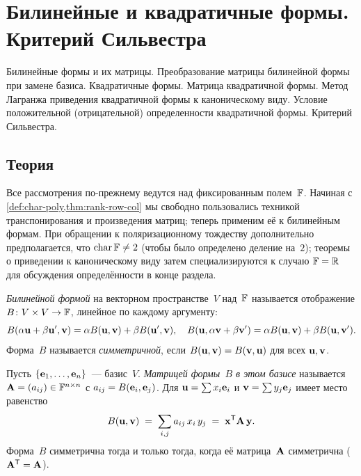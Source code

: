 
\section{Билинейные и квадратичные формы. Критерий Сильвестра}
\label{sec:1.1.07-quadratic-forms}

\begin{ticket}
Билинейные формы и их матрицы. Преобразование матрицы билинейной формы при замене базиса. Квадратичные формы. Матрица квадратичной формы. Метод Лагранжа приведения квадратичной формы к каноническому виду. Условие положительной (отрицательной) определенности квадратичной формы. Критерий Сильвестра.
\end{ticket}

\subsection*{Теория}

Все рассмотрения по-прежнему ведутся над фиксированным полем~$\mathbb{F}$.
Начиная с \cref{def:char-poly,thm:rank-row-col} мы свободно
пользовались техникой транспонирования и произведения матриц; теперь
применим её к билинейным формам. При обращении к поляризационному
тождеству дополнительно предполагается, что
$\operatorname{char} \mathbb{F} \neq 2$ (чтобы было определено деление на~$2$);
теоремы о приведении к каноническому виду затем специализируются к
случаю $\mathbb{F} = \mathbb{R}$ для обсуждения определённости в конце раздела.

\begin{definition}
\label{def:bilinear-form}
\emph{Билинейной формой} на векторном пространстве~$V$ над~$\mathbb{F}$
называется отображение $B \colon V \times V \to \mathbb{F}$, линейное по
каждому аргументу:
\[
  B(\alpha \mathbf{u} + \beta \mathbf{u}', \mathbf{v}) = \alpha B(\mathbf{u}, \mathbf{v}) + \beta B(\mathbf{u}', \mathbf{v}),
  \quad
  B(\mathbf{u}, \alpha \mathbf{v} + \beta \mathbf{v}') = \alpha B(\mathbf{u}, \mathbf{v}) + \beta B(\mathbf{u}, \mathbf{v}').
\]
Форма~$B$ называется \emph{симметричной}, если $B(\mathbf{u}, \mathbf{v}) = B(\mathbf{v}, \mathbf{u})$
для всех $\mathbf{u}, \mathbf{v}$.
\end{definition}

\begin{definition}
\label{def:matrix-bilinear}
Пусть $\{\mathbf{e}_1, \dots, \mathbf{e}_n\}$~--- базис~$V$.
\emph{Матрицей формы~$B$ в этом базисе} называется
$\mathbf{A} = (a_{ij}) \in \mathbb{F}^{n \times n}$ с $a_{ij} = B(\mathbf{e}_i, \mathbf{e}_j)$.
Для $\mathbf{u} = \sum x_i \mathbf{e}_i$ и $\mathbf{v} = \sum y_j \mathbf{e}_j$
имеет место равенство
\[
  B(\mathbf{u}, \mathbf{v}) \;=\; \sum_{i, j} a_{ij}\, x_i\, y_j \;=\; \mathbf{x}^{\mathsf{T}} \mathbf{A}\, \mathbf{y}.
\]
Форма~$B$ симметрична тогда и только тогда, когда её матрица~$\mathbf{A}$
симметрична ($\mathbf{A}^{\mathsf{T}} = \mathbf{A}$).
\end{definition}

